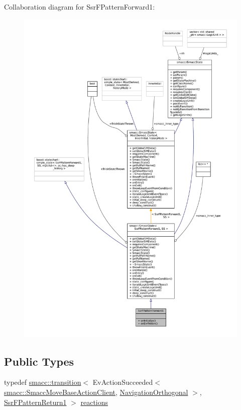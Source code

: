 Collaboration diagram for Ssr\+F\+Pattern\+Forward1\+:
\nopagebreak
\begin{figure}[H]
\begin{center}
\leavevmode
\includegraphics[width=350pt]{structSsrFPatternForward1__coll__graph}
\end{center}
\end{figure}
\subsection*{Public Types}
\begin{DoxyCompactItemize}
\item 
typedef \hyperlink{classsmacc_1_1transition}{smacc\+::transition}$<$ Ev\+Action\+Succeeded$<$ \hyperlink{classsmacc_1_1SmaccMoveBaseActionClient}{smacc\+::\+Smacc\+Move\+Base\+Action\+Client}, \hyperlink{classNavigationOrthogonal}{Navigation\+Orthogonal} $>$, \hyperlink{structSsrFPatternReturn1}{Ssr\+F\+Pattern\+Return1} $>$ \hyperlink{structSsrFPatternForward1_a9a3b01b8675bb587f7d5c698ff1e4858}{reactions}
\end{DoxyCompactItemize}

